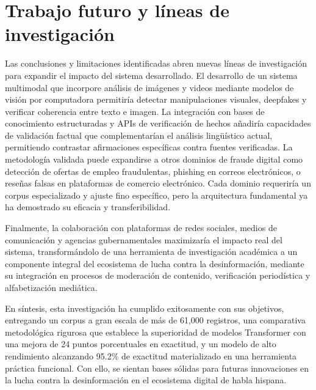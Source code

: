 \section{Trabajo futuro y líneas de investigación}

Las conclusiones y limitaciones identificadas abren nuevas líneas de investigación para expandir el impacto del sistema desarrollado. El desarrollo de un sistema multimodal que incorpore análisis de imágenes y videos mediante modelos de visión por computadora permitiría detectar manipulaciones visuales, deepfakes y verificar coherencia entre texto e imagen. La integración con bases de conocimiento estructuradas y APIs de verificación de hechos añadiría capacidades de validación factual que complementarían el análisis lingüístico actual, permitiendo contrastar afirmaciones específicas contra fuentes verificadas. La metodología validada puede expandirse a otros dominios de fraude digital como detección de ofertas de empleo fraudulentas, phishing en correos electrónicos, o reseñas falsas en plataformas de comercio electrónico. Cada dominio requeriría un corpus especializado y ajuste fino específico, pero la arquitectura fundamental ya ha demostrado su eficacia y transferibilidad.

Finalmente, la colaboración con plataformas de redes sociales, medios de comunicación y agencias gubernamentales maximizaría el impacto real del sistema, transformándolo de una herramienta de investigación académica a un componente integral del ecosistema de lucha contra la desinformación, mediante su integración en procesos de moderación de contenido, verificación periodística y alfabetización mediática.

En síntesis, esta investigación ha cumplido exitosamente con sus objetivos, entregando un corpus a gran escala de más de 61,000 registros, una comparativa metodológica rigurosa que establece la superioridad de modelos Transformer con una mejora de 24 puntos porcentuales en exactitud, y un modelo de alto rendimiento alcanzando 95.2\% de exactitud materializado en una herramienta práctica funcional. Con ello, se sientan bases sólidas para futuras innovaciones en la lucha contra la desinformación en el ecosistema digital de habla hispana.